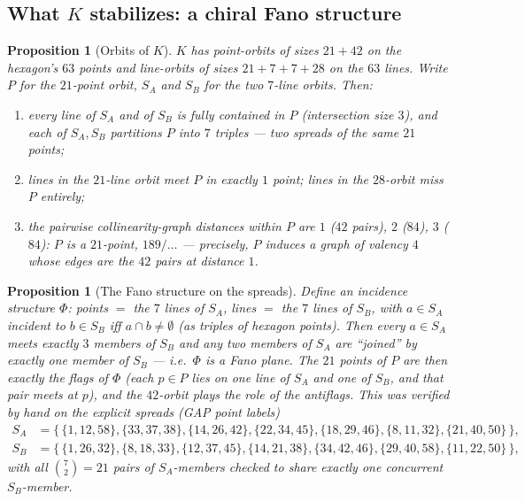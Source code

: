 \documentclass[11pt]{article}
\newtheorem{proposition}[theorem]{Proposition}
\theoremstyle{definition}
\begin{document}
\subsection{What $K$ stabilizes: a chiral Fano structure}

\begin{proposition}[Orbits of $K$]\label{prop:orbits}
$K$ has point-orbits of sizes $21 + 42$ on the hexagon's $63$ points and
line-orbits of sizes $21 + 7 + 7 + 28$ on the $63$ lines. Write $P$ for the
$21$-point orbit, $S_A$ and $S_B$ for the two $7$-line orbits. Then:
\begin{enumerate}
\item every line of $S_A$ and of $S_B$ is fully contained in $P$
(intersection size $3$), and each of $S_A,S_B$ \emph{partitions} $P$ into
$7$ triples --- two spreads of the same $21$ points;
\item lines in the $21$-line orbit meet $P$ in exactly $1$ point; lines in
the $28$-orbit miss $P$ entirely;
\item the pairwise collinearity-graph distances within $P$ are
$1$ ($42$ pairs), $2$ ($84$), $3$ ($84$): $P$ is a $21$-point,
$189/\ldots$ --- precisely, $P$ induces a graph of valency $4$ whose edges
are the $42$ pairs at distance $1$.
\end{enumerate}
\end{proposition}

\begin{proposition}[The Fano structure on the spreads]\label{prop:fanostructure}
Define an incidence structure $\Phi$: \emph{points} $=$ the $7$ lines of
$S_A$, \emph{lines} $=$ the $7$ lines of $S_B$, with $a \in S_A$ incident to
$b \in S_B$ iff $a \cap b \neq \emptyset$ (as triples of hexagon points).
Then every $a\in S_A$ meets exactly $3$ members of $S_B$ and any two members
of $S_A$ are ``joined'' by exactly one member of $S_B$ --- i.e.\ $\Phi$ is a
Fano plane. The $21$ points of $P$ are then exactly the \emph{flags} of
$\Phi$ (each $p \in P$ lies on one line of $S_A$ and one of $S_B$, and that
pair meets at $p$), and the $42$-orbit plays the role of the antiflags.
This was verified by hand on the explicit spreads (GAP point labels)
\begin{align*}
S_A &= \{\,\{1,12,58\},\{33,37,38\},\{14,26,42\},\{22,34,45\},
\{18,29,46\},\{8,11,32\},\{21,40,50\}\,\},\\
S_B &= \{\,\{1,26,32\},\{8,18,33\},\{12,37,45\},\{14,21,38\},
\{34,42,46\},\{29,40,58\},\{11,22,50\}\,\},
\end{align*}
with all $\binom{7}{2} = 21$ pairs of $S_A$-members checked to share
exactly one concurrent $S_B$-member.
\end{proposition}
\end{document}
